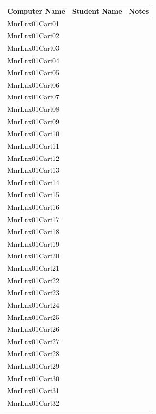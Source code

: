 \begin{tabular}{| l | p{7cm} | p{5cm} |}
        \hline
        \textbf{Computer Name} & \textbf{Student Name} & \textbf{Notes}\\ \hline
        MnrLnx01Cart01 & & \\ \hline
        MnrLnx01Cart02 & & \\ \hline
        MnrLnx01Cart03 & & \\ \hline
        MnrLnx01Cart04 & & \\ \hline
        MnrLnx01Cart05 & & \\ \hline
        MnrLnx01Cart06 & & \\ \hline
        MnrLnx01Cart07 & & \\ \hline
        MnrLnx01Cart08 & & \\ \hline
        MnrLnx01Cart09 & & \\ \hline
        MnrLnx01Cart10 & & \\ \hline
        MnrLnx01Cart11 & & \\ \hline
        MnrLnx01Cart12 & & \\ \hline
        MnrLnx01Cart13 & & \\ \hline
        MnrLnx01Cart14 & & \\ \hline
        MnrLnx01Cart15 & & \\ \hline
        MnrLnx01Cart16 & & \\ \hline
        MnrLnx01Cart17 & & \\ \hline
        MnrLnx01Cart18 & & \\ \hline
        MnrLnx01Cart19 & & \\ \hline
        MnrLnx01Cart20 & & \\ \hline
        MnrLnx01Cart21 & & \\ \hline
        MnrLnx01Cart22 & & \\ \hline
        MnrLnx01Cart23 & & \\ \hline
        MnrLnx01Cart24 & & \\ \hline
        MnrLnx01Cart25 & & \\ \hline
        MnrLnx01Cart26 & & \\ \hline
        MnrLnx01Cart27 & & \\ \hline
        MnrLnx01Cart28 & & \\ \hline
        MnrLnx01Cart29 & & \\ \hline
        MnrLnx01Cart30 & & \\ \hline
        MnrLnx01Cart31 & & \\ \hline
        MnrLnx01Cart32 & & \\ \hline
\end{tabular}
